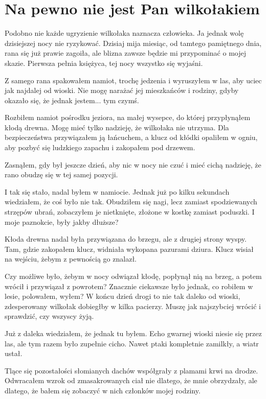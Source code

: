 \chapter{Na pewno nie jest Pan wilkołakiem} 

Podobno nie każde ugryzienie wilkołaka naznacza człowieka.
Ja jednak wolę dzisiejszej nocy nie ryzykować.
Dzisiaj mija miesiąc, od tamtego pamiętnego dnia, rana się już prawie zagoiła, ale blizna zawsze będzie mi przypominać o mojej skazie.
Pierwsza pełnia księżyca, tej nocy wszystko się wyjaśni.

Z samego rana spakowałem namiot, trochę jedzenia i wyruszyłem w las, aby uciec jak najdalej od wioski.
Nie mogę narażać jej mieszkańców i rodziny, gdyby okazało się, że jednak jestem... tym czymś.

Rozbiłem namiot pośrodku jeziora, na małej wysepce, do której przypłynąłem kłodą drewna. 
Mogę mieć tylko nadzieję, że wilkołaka nie utrzyma.
Dla bezpieczeństwa przywiązałem ją łańcuchem, a klucz od kłódki opaliłem w ogniu, aby pozbyć się ludzkiego zapachu i zakopałem pod drzewem.

Zasnąłem, gdy był jeszcze dzień, aby nic w nocy nie czuć i mieć cichą nadzieję, że rano obudzę się w tej samej pozycji.

\divider{}
I tak się stało, nadal byłem w namiocie. Jednak już po kilku sekundach wiedziałem, że coś było nie tak.
Obudziłem się nagi, lecz zamiast spodziewanych strzępów ubrań, zobaczyłem je nietknięte, złożone w kostkę zamiast poduszki.
I moje paznokcie, były jakby dłuższe?

Kłoda drewna nadal była przywiązana do brzegu, ale z drugiej strony wyspy.
Tam, gdzie zakopałem klucz, widniała wykopana pazurami dziura.
Klucz wisiał na wejściu, żebym z pewnością go znalazł.

Czy możliwe było, żebym w nocy odwiązał kłodę, popłynął nią na brzeg, a potem wrócił i przywiązał z powrotem?
Znacznie ciekawsze było jednak, co robiłem w lesie, polowałem, wyłem? 
W końcu dzień drogi to nie tak daleko od wioski, zdesperowany wilkołak dobiegłby w kilka pacierzy.
Muszę jak najszybciej wrócić i sprawdzić, czy wszyscy żyją.

\divider{}
Już z daleka wiedziałem, że jednak tu byłem.
Echo gwarnej wioski niesie się przez las, ale tym razem było zupełnie cicho.
Nawet ptaki kompletnie zamilkły, a wiatr ustał.

Tlące się pozostałości słomianych dachów współgrały z plamami krwi na drodze.
Odwracałem wzrok od zmasakrowanych ciał nie dlatego, że mnie obrzydzały, ale dlatego, że bałem się zobaczyć w nich członków mojej rodziny.

